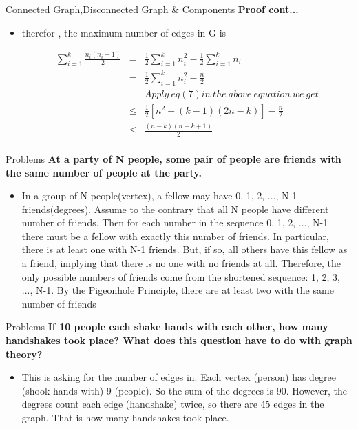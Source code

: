\documentclass{beamer}
\begin{document}
\begin{frame}{Connected Graph,Disconnected Graph \& Components}
	\textbf{Proof cont...}
	\begin{itemize}
		\item  therefor , the maximum number of edges in G is
		\begin{small}
			\begin{eqnarray*}
				\sum_{i=1}^{k}{\frac{n_i(n_i-1)}{2}}&=&\frac{1}{2}\sum_{i=1}^{k}{n_i^2}-\frac{1}{2}\sum_{i=1}^{k}{n_i}\\
				&=&\frac{1}{2}\sum_{i=1}^{k}{n_i^2}-\frac{n}{2}\\
			& &	Apply \ eq(7) in \ the\ above \ equation \ we \ get\\
				&\leq&\frac{1}{2}[n^2-(k-1)(2n-k)]-\frac{n}{2}\\
				&\leq&\frac{(n-k)(n-k+1)}{2}\\
			\end{eqnarray*}
		\end{small}
	\end{itemize}
\end{frame}

\begin{frame}{Problems}
	\textbf{At a party of N people, some pair of people are friends with the same number of people at the party.}
	\begin{itemize}
		\item  In a group of N people(vertex), a fellow may have 0, 1, 2, ..., N-1 friends(degrees). Assume to the contrary that all N people have different number of friends. Then for each number in the sequence 0, 1, 2, ..., N-1 there must be a fellow with exactly this number of friends. In particular, there is at least one with N-1 friends. But, if so, all others have this fellow as a friend, implying that there is no one with no friends at all. Therefore, the only possible numbers of friends come from the shortened sequence: 1, 2, 3, ..., N-1. By the Pigeonhole Principle, there are at least two with the same number of friends
	\end{itemize}
\end{frame}
\begin{frame}{Problems}
	\textbf{If 10 people each shake hands with each other, how many handshakes took place? What does this question have to do with graph theory?}
	\begin{itemize}
		\item  This is asking for the number of edges in.  Each vertex (person) has degree (shook hands with) 9 (people). So the sum of the degrees is  90.  However, the degrees count each edge (handshake) twice, so there are 45 edges in the graph. That is how many handshakes took place.
	\end{itemize}
\end{frame}
\end{document}
